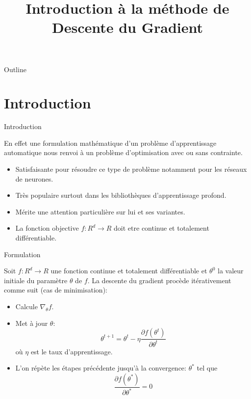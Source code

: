 \documentclass{beamer}
\title[Introduction à la méthode de Descente du Gradient]
{Introduction à la méthode de Descente du Gradient}
\institute[Universities of Yaoundé 1 - Department of Computer Science] %
\begin{document}
	
\begin{frame}
	\titlepage
\end{frame}

\begin{frame}{Outline}
\tableofcontents
\end{frame}


\section{Introduction}

\begin{frame}{Introduction}{}

	En effet une formulation mathématique d’un problème d’apprentissage	automatique nous renvoi à un problème d’optimisation avec ou sans contrainte. 
	\begin{itemize}
		\item Satisfaisante pour résoudre ce type de problème notamment pour les réseaux de neurones.
		\item Très populaire surtout dans les bibliothèques d'apprentissage profond.
		\item Mérite une attention particulière sur lui et ses variantes.
		\item La fonction objective $f : R^d \rightarrow R$ doit etre continue et totalement différentiable.
	\end{itemize}	
	
\end{frame}

\begin{frame}{Formulation}{}

Soit $f : R^d \rightarrow R$ une fonction continue et totalement différentiable et $\theta^{0}$ la valeur initiale du paramètre $\theta$ de $f$. La descente du gradient procède itérativement comme suit (cas de minimisation):

	\begin{itemize}
		\item Calcule $\nabla_{\theta}{f}$.
		\item Met à jour ${\theta}$:
			\begin{equation}
			\theta^{t+1}=\theta^{t}-\eta \frac{\partial{f(\theta^{t})}}{\partial{\theta^{t}}}
			\end{equation}
			où $\eta$ est le taux d'apprentissage.
		\item L’on répète les étapes précédente jusqu’à la convergence: $\theta^{*}$ tel que 
			\begin{equation}
			\frac{\partial{f(\theta^{*})}}{\partial{\theta^{*}}} = 0
			\end{equation}
		
	\end{itemize}

\end{frame}
\end{document}
